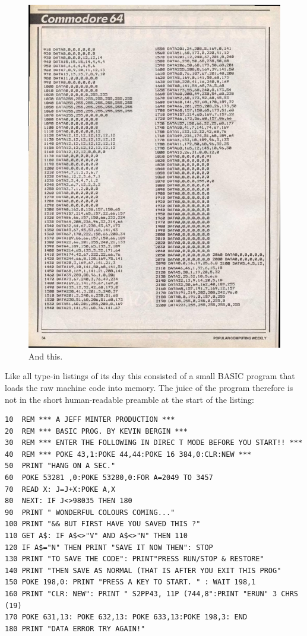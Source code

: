 \begin{figure}[H]
    \centering
    \begin{adjustbox}{width=12cm,center}
      \includegraphics[width=12cm]{src/listing/PopularComputing_Weekly_Issue_1984-12-13_0033.jpg}%
    \end{adjustbox}
\caption{And this.}
\end{figure}

Like all type-in listings of its day this consisted of a small BASIC program
that loads the raw machine code into memory. The juice of the program therefore
is not in the short human-readable preamble at the start of the listing:

\lstset{style=C64BasicStyle}
\begin{lstlisting}
10  REM *** A JEFF MINTER PRODUCTION ***
20  REM *** BASIC PROG. BY KEVIN BERGIN ***
30  REM *** ENTER THE FOLLOWING IN DIREC T MODE BEFORE YOU START!! ***
40  REM *** POKE 43,1:POKE 44,44:POKE 16 384,0:CLR:NEW ***
50  PRINT "HANG ON A SEC."
60  POKE 53281 ,0:POKE 53280,0:FOR A=2049 TO 3457
70  READ X: J=J+X:POKE A,X
80  NEXT: IF J<>98035 THEN 180
90  PRINT " WONDERFUL COLOURS COMING..."
100 PRINT "&& BUT FIRST HAVE YOU SAVED THIS ?"
110 GET A$: IF A$<>"V" AND A$<>"N" THEN 110
120 IF A$="N" THEN PRINT "SAVE IT NOW THEN": STOP
130 PRINT "TO SAVE THE CODE": PRINT"PRESS RUN/STOP & RESTORE"
140 PRINT "THEN SAVE AS NORMAL (THAT IS AFTER YOU EXIT THIS PROG"
150 POKE 198,0: PRINT "PRESS A KEY TO START. " : WAIT 198,1
160 PRINT "CLR: NEW": PRINT " S2PP43, 11P (744,8":PRINT "ERUN" 3 CHRS (19)
170 POKE 631,13: POKE 632,13: POKE 633,13:POKE 198,3: END
180 PRINT "DATA ERROR TRY AGAIN!"
\end{lstlisting}

